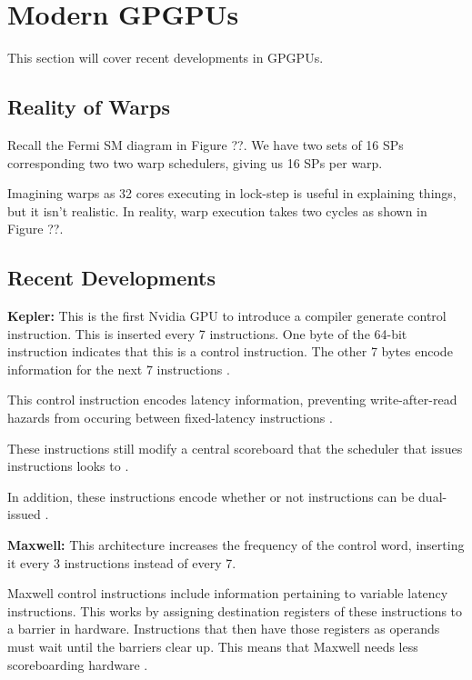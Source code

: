 \section{Modern GPGPUs}

This section will cover recent developments in GPGPUs.

\subsection{Reality of Warps}

Recall the Fermi SM diagram in Figure ??. We have two sets of 16 SPs corresponding
two two warp schedulers, giving us 16 SPs per warp.

Imagining warps as 32 cores executing in lock-step is useful in explaining things,
but it isn't realistic. In reality, warp execution takes two cycles as shown
in Figure ??.

\subsection{Recent Developments}

\textbf{Kepler:} This is the first Nvidia GPU to introduce a compiler generate control instruction.
This is inserted every 7 instructions. One byte of the 64-bit instruction indicates
that this is a control instruction. The other 7 bytes encode information for the
next 7 instructions \cite{chipsandcheeseInsideKepler}.

This control instruction encodes latency information, preventing write-after-read hazards
from occuring between fixed-latency instructions \cite{chipsandcheeseInsideKepler}.

These instructions still modify a central scoreboard that the scheduler that
issues instructions looks to \cite{chipsandcheeseInsideKepler} \cite{adalbert2022pastis}.

In addition, these instructions encode whether or not instructions can be dual-issued \cite{chipsandcheeseInsideKepler}.

\textbf{Maxwell:} This architecture increases the frequency of the control word,
inserting it every 3 instructions instead of every 7. 

Maxwell control instructions include information pertaining to variable latency
instructions. This works by assigning destination registers of these instructions
to a barrier in hardware. Instructions that then have those
registers as operands must wait until the barriers clear up. This means
that Maxwell needs less scoreboarding hardware \cite{chipsandcheeseMaxwellNvidias}.

